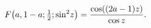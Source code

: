 \[\mathop{F\/}\nolimits\!\left(a,1-a;\tfrac{1}{2};{\mathop{\sin\/}\nolimits^{2}}%
z\right)=\frac{\mathop{\cos\/}\nolimits\!\left((2a-1)z\right)}{\mathop{\cos\/}%
\nolimits z}.\]